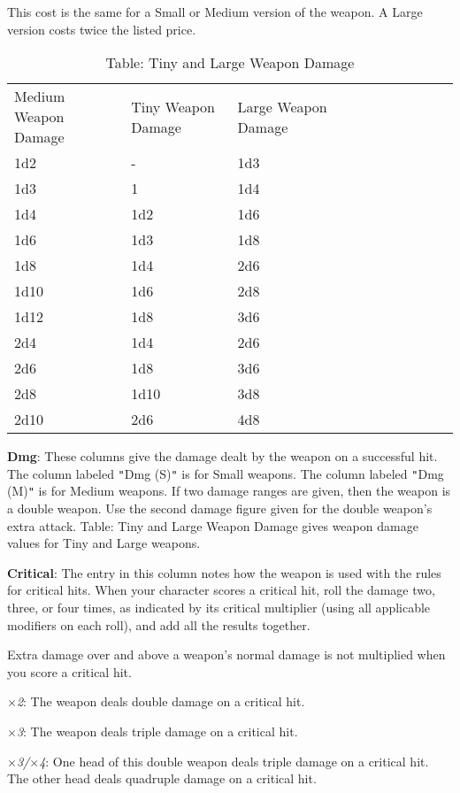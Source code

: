 This cost is the same for a Small or Medium version of the weapon. A Large version costs twice the listed price.
		

\begin{table}[]
\sffamily
\caption{Table: Tiny and Large Weapon Damage}
\begin{tabular}{lllllllllll}
Medium Weapon Damage & Tiny Weapon Damage & Large Weapon Damage\\
1d2& -& 1d3 \\
1d3& 1& 1d4 \\
1d4& 1d2& 1d6 \\
1d6& 1d3& 1d8 \\
1d8& 1d4& 2d6 \\
1d10& 1d6& 2d8 \\
1d12& 1d8& 3d6 \\
2d4& 1d4& 2d6 \\
2d6& 1d8& 3d6 \\
2d8& 1d10& 3d8 \\
2d10& 2d6& 4d8\\
\end{tabular}
\end{table}
		
\textbf{Dmg}: These columns give the damage dealt by the weapon on a successful hit. The column labeled \texttt{{}"{}}Dmg (S)\texttt{{}"{}} is for Small weapons. The column labeled \texttt{{}"{}}Dmg (M)\texttt{{}"{}} is for Medium weapons. If two damage ranges are given, then the weapon is a double weapon. Use the second damage figure given for the double weapon's extra attack. Table: Tiny and Large Weapon Damage gives weapon damage values for Tiny and Large weapons.
		
\textbf{Critical}: The entry in this column notes how the weapon is used with the rules for critical hits. When your character scores a critical hit, roll the damage two, three, or four times, as indicated by its critical multiplier (using all applicable modifiers on each roll), and add all the results together.
		
Extra damage over and above a weapon's normal damage is not multiplied when you score a critical hit.
		
\mbox{$\times$}\textit{2}: The weapon deals double damage on a critical hit.
		
\mbox{$\times$}\textit{3}: The weapon deals triple damage on a critical hit.
		
\mbox{$\times$}\textit{3/}\mbox{$\times$}\textit{4}: One head of this double weapon deals triple damage on a critical hit. The other head deals quadruple damage on a critical hit.
		
